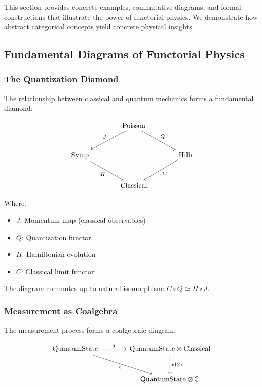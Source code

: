 This section provides concrete examples, commutative diagrams, and formal constructions that illustrate the power of functorial physics. We demonstrate how abstract categorical concepts yield concrete physical insights.

\subsection{Fundamental Diagrams of Functorial Physics}

\subsubsection{The Quantization Diamond}

The relationship between classical and quantum mechanics forms a fundamental diamond:

\[
\begin{tikzcd}[row sep=large, column sep=large]
& \text{Poisson} \arrow[dl, "J"'] \arrow[dr, "Q"] & \\
\text{Symp} \arrow[dr, "H"'] & & \text{Hilb} \arrow[dl, "C"] \\
& \text{Classical} &
\end{tikzcd}
\]

Where:
\begin{itemize}
\item $J$: Momentum map (classical observables)
\item $Q$: Quantization functor
\item $H$: Hamiltonian evolution
\item $C$: Classical limit functor
\end{itemize}

The diagram commutes up to natural isomorphism: $C \circ Q \simeq H \circ J$.

\subsubsection{Measurement as Coalgebra}

The measurement process forms a coalgebraic diagram:

\[
\begin{tikzcd}[row sep=large, column sep=large]
\text{QuantumState} \arrow[r, "\delta"] \arrow[dr, "\epsilon"'] & 
\text{QuantumState} \otimes \text{Classical} \arrow[d, "\text{id} \otimes \epsilon"] \\
& \text{QuantumState} \otimes \mathbb{C}
\end{tikzcd}
\]

